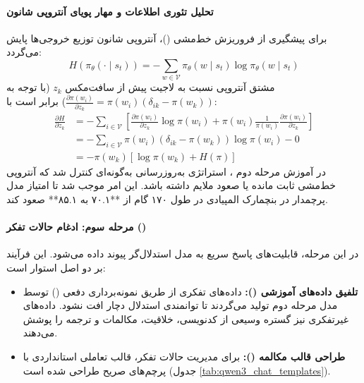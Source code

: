 \paragraph*{تحلیل تئوری اطلاعات و مهار پویای آنتروپی شانون}
برای پیشگیری از فروریزش خط‌مشی ()، آنتروپی شانون توزیع خروجی‌ها پایش می‌گردد:
\begin{equation}
    H(\pi_\theta(\cdot \mid s_t)) = - \sum_{w \in \mathcal{V}} \pi_\theta(w \mid s_t) \log \pi_\theta(w \mid s_t)
\end{equation}
مشتق آنتروپی نسبت به لاجیت پیش از سافت‌مکس $z_k$ (با توجه به $\frac{\partial \pi(w_i)}{\partial z_k} = \pi(w_i)(\delta_{ik} - \pi(w_k))$) برابر است با:
\begin{equation}
\begin{aligned}
    \frac{\partial H}{\partial z_k} &= - \sum_{i \in \mathcal{V}} \left[ \frac{\partial \pi(w_i)}{\partial z_k} \log \pi(w_i) + \pi(w_i) \frac{1}{\pi(w_i)} \frac{\partial \pi(w_i)}{\partial z_k} \right] \\
    &= - \sum_{i \in \mathcal{V}} \pi(w_i)(\delta_{ik} - \pi(w_k)) \log \pi(w_i) - 0 \\
    &= - \pi(w_k) \left[ \log \pi(w_k) + H(\pi) \right]
\end{aligned}
\end{equation}
در آموزش مرحله دوم ، استراتژی به‌روزرسانی به‌گونه‌ای کنترل شد که آنتروپی خط‌مشی ثابت مانده یا صعود ملایم داشته باشد. این امر موجب شد تا امتیاز مدل پرچمدار  در بنچمارک المپیادی  در طول ۱۷۰ گام از **۷۰.۱ به ۸۵.۱** صعود کند.

\paragraph*{مرحله سوم: ادغام حالات تفکر ()}
در این مرحله، قابلیت‌های پاسخ سریع به مدل استدلال‌گر پیوند داده می‌شود. این فرآیند بر دو اصل استوار است:
\begin{itemize}
    \item \textbf{تلفیق داده‌های آموزشی ():} داده‌های تفکری از طریق نمونه‌برداری دفعی () توسط مدل مرحله دوم تولید می‌گردند تا توانمندی استدلال دچار افت نشود. داده‌های غیرتفکری نیز گستره وسیعی از کدنویسی، خلاقیت، مکالمات و ترجمه را پوشش می‌دهند.
    \item \textbf{طراحی قالب مکالمه ():} برای مدیریت حالات تفکر، قالب تعاملی استانداردی با پرچم‌های صریح طراحی شده است (جدول \ref{tab:qwen3_chat_templates}).
\end{itemize}

